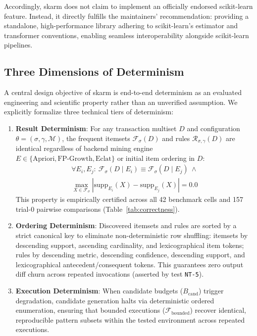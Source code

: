 \documentclass[twocolumn,10pt]{article}
\newcommand{\skarm}{\textsf{skarm}\xspace}
\begin{document}
Accordingly, \skarm does not claim to implement an officially endorsed scikit-learn feature. Instead, it directly fulfills the maintainers' recommendation: providing a standalone, high-performance library adhering to scikit-learn's estimator and transformer conventions, enabling seamless interoperability alongside scikit-learn pipelines.

\subsection{Three Dimensions of Determinism}
\label{sec:determinism_dims}
A central design objective of \skarm is end-to-end determinism as an evaluated engineering and scientific property rather than an unverified assumption. We explicitly formalize three technical tiers of determinism:
\begin{enumerate}\setlength{\itemsep}{1pt}\setlength{\parskip}{0pt}
  \item \textbf{Result Determinism}: For any transaction multiset $D$ and configuration $\theta = (\sigma, \gamma, \mathcal{M})$, the frequent itemsets $\mathcal{F}_\sigma(D)$ and rules $\mathcal{R}_{\sigma,\gamma}(D)$ are identical regardless of backend mining engine $E \in \{\text{Apriori}, \text{FP-Growth}, \text{Eclat}\}$ or initial item ordering in $D$:
  \begin{equation}
  \begin{split}
  \forall E_i, E_j:\ \mathcal{F}_\sigma(D \mid E_i) \equiv \mathcal{F}_\sigma(D \mid E_j) \ \wedge \\
  \max_{X \in \mathcal{F}_\sigma} |\mathrm{supp}_{E_i}(X) - \mathrm{supp}_{E_j}(X)| = 0.0
  \end{split}
  \end{equation}
  This property is empirically certified across all 42 benchmark cells and 157 trial-0 pairwise comparisons (Table~\ref{tab:correctness}).
  \item \textbf{Ordering Determinism}: Discovered itemsets and rules are sorted by a strict canonical key to eliminate non-deterministic row shuffling: itemsets by descending support, ascending cardinality, and lexicographical item tokens; rules by descending metric, descending confidence, descending support, and lexicographical antecedent/consequent tokens. This guarantees zero output diff churn across repeated invocations (asserted by test \texttt{NT-5}).
  \item \textbf{Execution Determinism}: When candidate budgets ($B_{\text{cand}}$) trigger degradation, candidate generation halts via deterministic ordered enumeration, ensuring that bounded executions ($\mathcal{F}_{\text{bounded}}$) recover identical, reproducible pattern subsets within the tested environment across repeated executions.
\end{enumerate}
\end{document}
